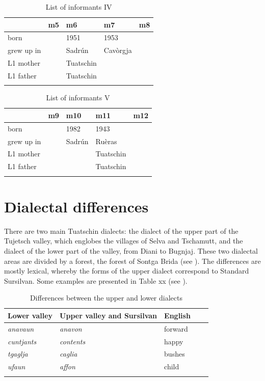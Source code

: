 \begin{table}
\caption{List of informants IV}
\label{tab:informantsIV}
 \begin{tabular}{lllll}
  \lsptoprule
  & m5 & m6 & m7 & m8\\
  \midrule
born &  & 1951 & 1953 &\\
grew up in &  & Sadrún & Cavòrgja &\\
L1 mother & & Tuatschin \\
L1 father & & Tuatschin \\
 \lspbottomrule
 \end{tabular}
\end{table}

\begin{table}
\caption{List of informants V}
\label{tab:informantsIV}
 \begin{tabular}{lllll}
  \lsptoprule
  & m9 & m10 & m11 & m12\\
  \midrule
born &  & 1982 & 1943&\\
grew up in &  &  Sadrún & Ruèras& \\
L1 mother & & & Tuatschin\\
L1 father & & & Tuatschin\\
 \lspbottomrule
 \end{tabular}
\end{table}

\section{Dialectal differences}
There are two main Tuatschin dialects: the dialect of the upper part of the Tujetsch valley, which englobes the villages of Selva and Tschamutt, and the dialect of the lower part of the valley, from Diani to Bugnjaj. These two dialectal areas are divided by a forest, the forest of Sontga Brida (see \citet{Caduff 1952: 3}). The differences are mostly lexical, whereby the forms of the upper dialect correspond to Standard Sursilvan. Some examples are presented in Table xx (see \citet{VicHendry2010: 97}).

\begin{table}
\caption{Differences between the upper and lower dialects}
\label{difdial}
 \begin{tabular}{lllll}
  \lsptoprule
     Lower valley &  Upper valley and Sursilvan & English\\
  \midrule
   \textit{anavaun} & \textit{anavon} & forward \\
   \textit{cuntjants} & \textit{contents} & happy \\
   \textit{tgaglja} & \textit{caglia} & bushes\\
   \textit{ufaun} & \textit{affon} & child \\
\lspbottomrule
 \end{tabular}
\end{table}

